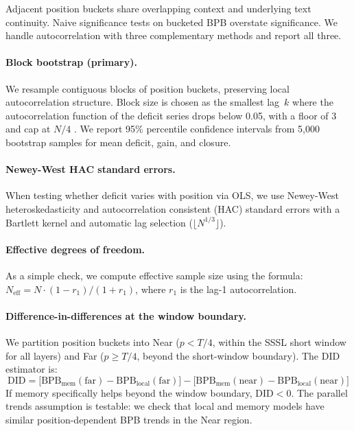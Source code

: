 \documentclass[11pt]{article}
\newcommand{\bpb}{\mathrm{BPB}}
\begin{document}
Adjacent position buckets share overlapping context and underlying
text continuity. Naive significance tests on bucketed BPB overstate
significance. We handle autocorrelation with three complementary
methods and report all three.

\paragraph{Block bootstrap (primary).}
We resample contiguous blocks of position buckets, preserving
local autocorrelation structure. Block size is chosen as the
smallest lag~$k$ where the autocorrelation function of the deficit
series drops below 0.05, with a floor of 3 and cap at $N/4$
\citep[following][]{metaasr}. We report 95\% percentile
confidence intervals from 5,000 bootstrap samples for mean
deficit, gain, and closure.

\paragraph{Newey-West HAC standard errors.}
When testing whether deficit varies with position via OLS, we use
Newey-West heteroskedasticity and autocorrelation consistent (HAC)
standard errors \citep{newey1987hac} with a Bartlett kernel and
automatic lag selection ($\lfloor N^{1/3} \rfloor$).

\paragraph{Effective degrees of freedom.}
As a simple check, we compute effective sample size using the
\citet{bretherton1999effective} formula:
$N_{\text{eff}} = N \cdot (1 - r_1) / (1 + r_1)$, where $r_1$
is the lag-1 autocorrelation.

\paragraph{Difference-in-differences at the window boundary.}
We partition position buckets into Near ($p < T/4$, within the
SSSL short window for all layers) and Far ($p \geq T/4$, beyond
the short-window boundary). The DID estimator is:
\begin{equation}
  \text{DID} = \bigl[\bpb_{\text{mem}}(\text{far}) - \bpb_{\text{local}}(\text{far})\bigr]
             - \bigl[\bpb_{\text{mem}}(\text{near}) - \bpb_{\text{local}}(\text{near})\bigr]
  \label{eq:did}
\end{equation}
If memory specifically helps beyond the window boundary,
$\text{DID} < 0$. The parallel trends assumption is testable:
we check that local and memory models have similar
position-dependent BPB trends in the Near region.
\end{document}
